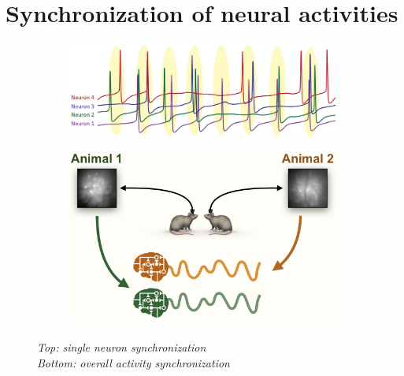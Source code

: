 \documentclass[12pt, a4paper]{report}
\begin{document}
\section{Synchronization of neural activities} \label{section 1.5}

\begin{figure}[H]
	\begin{minipage}{\linewidth}
		\centering
		\begin{minipage}{0.6\linewidth}
			\begin{figure}[H]
				\includegraphics[width=\linewidth]{synch.png}
				
			\end{figure}
		\end{minipage}
		\hspace{0.05\linewidth}
		\begin{minipage}{0.6\linewidth}
			\begin{figure}[H]
				\includegraphics[width=\linewidth]{Intebrain.png}
				
			\end{figure}
		\end{minipage}
		
	\end{minipage}
\caption{\textit{Top: single neuron synchronization \\
		Bottom: overall activity synchronization}} \label{synch}
\end{figure}
\end{document}
